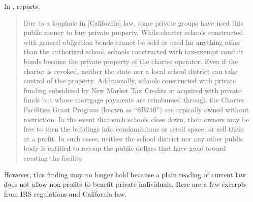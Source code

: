 In , \citeauthor{ITPI2018} reports,
\blockquote[{\parencite[6]{ITPI2018}}][.]{%
Due to a loophole in [California] law, some private groups have used this public money to buy private property. While charter schools constructed with general obligation bonds cannot be sold or used for anything other than the authorized school, schools constructed with tax-exempt conduit bonds become the private property of the charter operator. Even if the charter is revoked, neither the state nor a local school district can take control of this property. Additionally, schools constructed with private funding subsidized by New Market Tax Credits or acquired with private funds but whose mortgage payments are reimbursed through the Charter Facilities Grant Program (known as “SB740”) are typically owned without restriction. In the event that such schools close down, their owners may be free to turn the buildings into condominiums or retail space, or sell them at a profit. In such cases, neither the school district nor any other public body is entitled to recoup the public dollars that have gone toward creating the facility}
However, this finding may no longer hold because a plain reading of current law does not allow non-profits to benefit private individuals. Here are a few excerpts from IRS regulations and California law.
